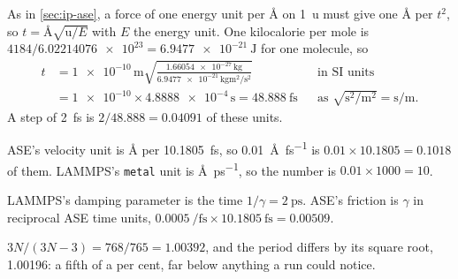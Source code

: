 \label{sec:ip-solutions}

As in \cref{sec:ip-ase}, a force of one
energy unit per \si{\angstrom} on \SI{1}{\amu} must give one
\si{\angstrom} per $t^2$, so $t = \si{\angstrom}\sqrt{\si{\amu}/E}$ with
$E$ the energy unit. One kilocalorie per mole is $4184/\num{6.02214076e23}
= \SI{6.9477e-21}{\joule}$ for one molecule, so
\begin{align*}
   t &= \num{1e-10}\,\si{\metre}\sqrt{\frac{\num{1.66054e-27}\,\si{\kilogram}}
        {\num{6.9477e-21}\,\si{\kilogram\metre\squared\per\second\squared}}}
     && \text{in SI units}\\
     &= \num{1e-10}\times\num{4.8888e-4}\,\si{\second}
      = \SI{48.888}{\femto\second}
     && \text{as $\sqrt{\si{\second\squared}/\si{\metre\squared}} =
        \si{\second\per\metre}$.}
\end{align*}
A step of \SI{2}{\femto\second} is $2/48.888 = 0.04091$ of these units.

ASE's velocity unit is \si{\angstrom} per
\SI{10.1805}{\femto\second}, so \SI{0.01}{\angstrom\per\femto\second} is
$0.01\times10.1805 = 0.1018$ of them. LAMMPS's \texttt{metal} unit is
\si{\angstrom\per\pico\second}, so the number is $0.01\times1000 = 10$.

LAMMPS's damping parameter is the time $1/\gamma
= \SI{2}{\pico\second}$. ASE's friction is $\gamma$ in reciprocal ASE time
units, $\SI{0.0005}{\per\femto\second}\times\SI{10.1805}{\femto\second} =
0.00509$.

$3N/(3N - 3) = 768/765 = 1.00392$, and the
period differs by its square root, 1.00196: a fifth of a per cent, far
below anything a run could notice.

